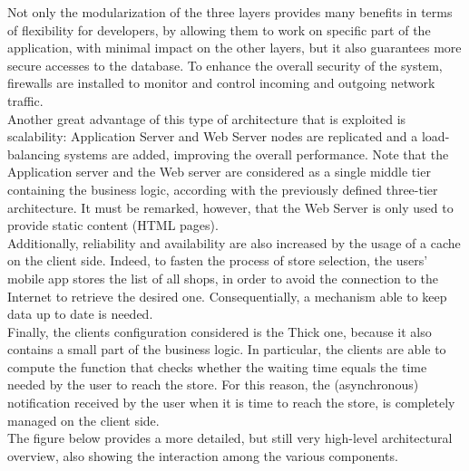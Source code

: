\documentclass{article}
\begin{document}
Not only the modularization of the three layers provides many benefits in terms of flexibility for developers, by allowing them to work on specific part of the application, with minimal impact on the other layers, but it also guarantees more secure accesses to the database. To enhance the overall security of the system, firewalls are installed to monitor and control incoming and outgoing network traffic.
\smallskip\\
Another great advantage of this type of architecture that is exploited is scalability: Application Server and Web Server nodes are replicated and a load-balancing systems are added, improving the overall performance. Note that the Application server and the Web server are considered as a single middle tier containing the business logic, according with the previously defined three-tier architecture. It must be remarked, however, that the Web Server is only used to provide static content (HTML pages).
\smallskip\\
Additionally, reliability and availability are also increased by the usage of a cache on the client side. Indeed, to fasten the process of store selection, the users’ mobile app stores the list of all shops, in order to avoid the connection to the Internet to retrieve the desired one. Consequentially, a mechanism able to keep data up to date is needed.
\smallskip\\
Finally, the clients configuration considered is the Thick one, because it also contains a small part of the business logic. In particular, the clients are able to compute the function that checks whether the waiting time equals the time needed by the user to reach the store. For this reason, the (asynchronous) notification received by the user when it is time to reach the store, is completely managed on the client side.
\smallskip\\
The figure below provides a more detailed, but still very high-level architectural overview, also showing the interaction among the various components.\\
\smallskip\\
\end{document}
